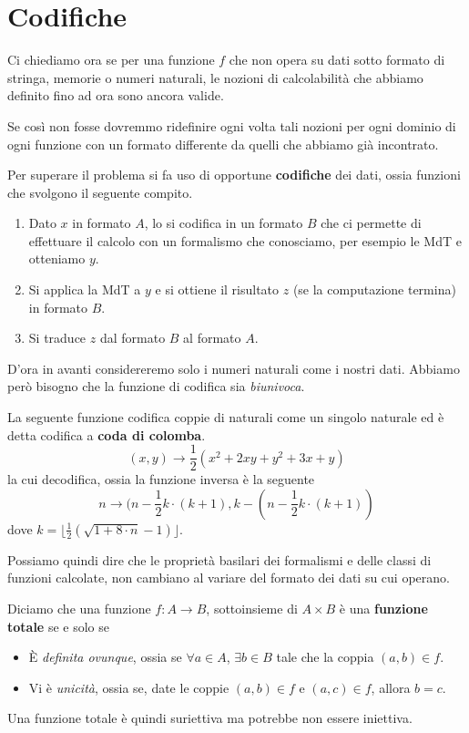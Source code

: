 \section{Codifiche}
Ci chiediamo ora se per una funzione $f$ che non opera su
dati sotto formato di stringa, memorie o numeri naturali,
le nozioni di calcolabilità che abbiamo definito fino ad ora
sono ancora valide.

Se così non fosse dovremmo ridefinire ogni volta tali nozioni
per ogni dominio di ogni funzione con un formato differente da
quelli che abbiamo già incontrato.

Per superare il problema si fa uso di opportune
\textbf{codifiche} dei dati, ossia funzioni che svolgono
il seguente compito.
\begin{enumerate}
	\item Dato $x$ in formato $A$, lo si codifica in un formato
	      $B$ che ci permette di effettuare il calcolo con un
	      formalismo che conosciamo, per esempio le MdT e
	      otteniamo $y$.
	\item Si applica la MdT a $y$ e si ottiene il risultato $z$
	      (se la computazione termina) in formato $B$.
	\item Si traduce $z$ dal formato $B$ al formato $A$.
\end{enumerate}
D'ora in avanti considereremo solo i numeri naturali come i
nostri dati. Abbiamo però bisogno che la funzione di codifica
sia \emph{biunivoca}.

\begin{example}
	La seguente funzione codifica coppie di naturali come un
	singolo naturale ed è detta codifica a
	\textbf{coda di colomba}.
	\[ (x, y) \to \frac{1}{2} (x^2 + 2 x y + y^2 + 3 x + y) \]
	la cui decodifica, ossia la funzione inversa è la seguente
	\[
		n \to (n - \frac{1}{2} k \cdot (k + 1),
		k - (n - \frac{1}{2} k \cdot (k + 1))
	\]
	dove $k=\lfloor \frac{1}{2}(\sqrt{1+8\cdot n}-1)\rfloor$.
\end{example}

Possiamo quindi dire che le proprietà basilari dei formalismi
e delle classi di funzioni calcolate, non cambiano al variare
del formato dei dati su cui operano.

\begin{definition} \label{def: funzione totale}
	Diciamo che una funzione $f : A \to B$, sottoinsieme di
	$A \times B$ è una \textbf{funzione totale} se e solo se
	\begin{itemize}
		\item \`E \emph{definita ovunque}, ossia se
		      $\forall a \in A$, $\exists b \in B$ tale che la
		      coppia $(a, b) \in f$.
		\item Vi è \emph{unicità}, ossia se, date le coppie
		      $(a, b) \in f$ e $(a, c) \in f$, allora $b=c$.
	\end{itemize}
	Una funzione totale è quindi suriettiva ma potrebbe non
	essere iniettiva.
\end{definition}

